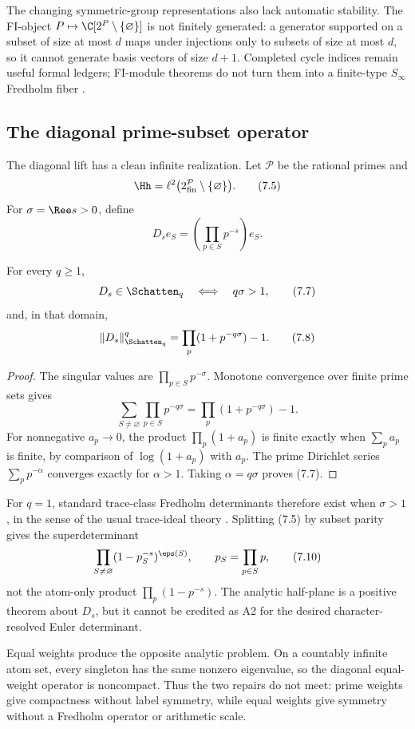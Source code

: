 The changing symmetric-group representations also lack automatic stability.
The FI-object $P\mapsto\C[2^P\setminus\{\varnothing\}]$ is not finitely
generated: a generator supported on a subset of size at most $d$ maps under
injections only to subsets of size at most $d$, so it cannot generate basis
vectors of size $d+1$.  Completed cycle indices remain useful formal ledgers;
FI-module theorems do not turn them into a finite-type $S_\infty$ Fredholm
fiber \citep{ChurchEllenbergFarb2015FI}.

\subsection{The diagonal prime-subset operator}

The diagonal lift has a clean infinite realization.  Let $\mathcal P$ be the
rational primes and
\[
  \Hh=\ell^2\bigl(2^{\mathcal P}_{\mathrm{fin}}
                 \setminus\{\varnothing\}\bigr).
  \tag{7.5}
\]
For $\sigma=\Ree s>0$, define
\[
  D_se_S=\left(\prod_{p\in S}p^{-s}\right)e_S.
  \tag{7.6}
\]

\begin{theorem}
\label{thm:schatten}
For every $q\ge1$,
\[
 D_s\in\Schatten_q
 \quad\Longleftrightarrow\quad q\sigma>1,
 \tag{7.7}
\]
and, in that domain,
\[
 \|D_s\|_{\Schatten_q}^q
 =\prod_p(1+p^{-q\sigma})-1.
 \tag{7.8}
\]
\end{theorem}

\begin{proof}
The singular values are $\prod_{p\in S}p^{-\sigma}$.  Monotone convergence
over finite prime sets gives
\[
 \sum_{S\ne\varnothing}\prod_{p\in S}p^{-q\sigma}
 =\prod_p(1+p^{-q\sigma})-1.
 \tag{7.9}
\]
For nonnegative $a_p\to0$, the product $\prod_p(1+a_p)$ is finite exactly
when $\sum_pa_p$ is finite, by comparison of $\log(1+a_p)$ with $a_p$.
The prime Dirichlet series $\sum_pp^{-\alpha}$ converges exactly for
$\alpha>1$.  Taking $\alpha=q\sigma$ proves (7.7).
\end{proof}

For $q=1$, standard trace-class Fredholm determinants therefore exist when
$\sigma>1$, in the sense of the usual trace-ideal theory
\citep{Simon1977InfiniteDeterminants}.  Splitting (7.5) by subset parity gives
the superdeterminant
\[
  \prod_{S\ne\varnothing}(1-p_S^{-s})^{\eps(S)},
  \qquad p_S=\prod_{p\in S}p,
  \tag{7.10}
\]
not the atom-only product $\prod_p(1-p^{-s})$.  The analytic half-plane is a
positive theorem about $D_s$, but it cannot be credited as A2 for the desired
character-resolved Euler determinant.

Equal weights produce the opposite analytic problem.  On a countably
infinite atom set, every singleton has the same nonzero eigenvalue, so the
diagonal equal-weight operator is noncompact.  Thus the two repairs do not
meet: prime weights give compactness without label symmetry, while equal
weights give symmetry without a Fredholm operator or arithmetic scale.
